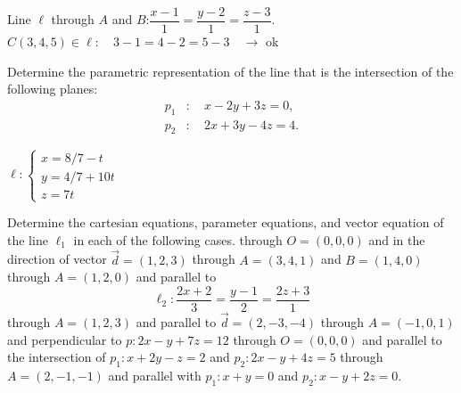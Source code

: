 \begin{Answer}\phantom{}
    Line $\ell$ through $A$ and $B$:\quad $\dfrac{x-1}{1} = \dfrac{y-2}{1} = \dfrac{z-3}{1}$. \\[0.2cm]
	$C(3,4,5) \in \ell: \quad 3-1 = 4-2 = 5-3 \quad \rightarrow $ ok
\end{Answer}

\ifanalysis\begin{Exercise}[difficulty = 1]\fi\ifcalculus\begin{Exercise}[difficulty = 2]\fi Determine the parametric representation of the line that is the intersection of the following planes:
	\begin{align*}
	p_1&:\quad x-2y+3z=0,  \\
	p_2&:\quad 2x+3y-4z=4. 
	\end{align*}

\ifanalysis\end{Exercise}\fi\ifcalculus\end{Exercise}\fi

\begin{Answer}\phantom{}
    $\ell: \left\{\begin{array}{l}
	x=8/7 -t \\
	y=4/7 + 10t \\
	z=7t\end{array}\right.$ 
\end{Answer}

\begin{Exercise} Determine the cartesian equations, parameter equations, and vector equation of the line  $\ell_1$ in each of the following cases.
		\Question[difficulty = 1] through $O=(0,0,0)$ and in the direction of vector $\vec{d}=(1,2,3)$
		\Question[difficulty = 1] through $A=(3,4,1)$ and $B=(1,4,0)$
		\Question[difficulty = 1] through $A=(1,2,0)$ and parallel to  $$\ell_2: \dfrac{2x+2}{3}=\dfrac{y-1}{2}=\dfrac{2z+3}{1}$$  
		\Question[difficulty = 1] through $A=(1,2,3)$ and parallel to $\vec{d}=(2,-3,-4)$ 
		\Question[difficulty = 1] through $A=(-1,0,1)$ and perpendicular to  $p: 2x-y+7z=12$ 
		\Question[difficulty = 2] through $O=(0,0,0)$ and parallel to the intersection of $p_1: x+2y-z=2$ and $p_2: 2x-y+4z=5$ 
		\Question[difficulty = 2] through $A=(2,-1,-1)$ and parallel with  $p_1: x+y=0$ and $p_2: x-y+2z=0$. 

\end{Exercise}

